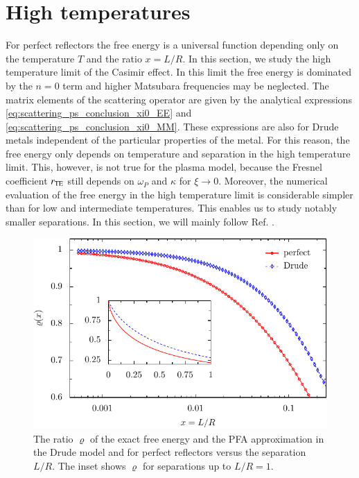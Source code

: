 \section{High temperatures}
\label{section_thermal_hi_temp}
\newcommand{\lnmu}{\log\,\mu}

For perfect reflectors the free energy is a universal function depending only
on the temperature $T$ and the ratio $x=L/R$. In this section, we study the
high temperature limit of the Casimir effect. In this limit the free energy is
dominated by the $n=0$ term and higher Matsubara frequencies may be
neglected. The matrix elements of the scattering operator are given by the
analytical expressions \eqref{eq:scattering_ps_conclusion_xi0_EE} and
\eqref{eq:scattering_ps_conclusion_xi0_MM}. These expressions are also for
Drude metals independent of the particular properties of the metal. For this
reason, the free energy only depends on temperature and separation in the high temperature
limit. This, however, is not true for the plasma model, because the Fresnel
coefficient $r_{\mathrm{TE}}$ still depends on $\omega_P$ and $\kappa$ for $\xi\to0$.
Moreover, the numerical evaluation of the free energy in the high temperature
limit is considerable simpler than for low and intermediate temperatures. This
enables us to study notably smaller separations. In this section, we will mainly
follow Ref. \cite{PhysRevA.85.052501}.

\begin{figure}
\begin{center}
\includegraphics[scale=1]{plots/hiT/rho_vs_lnx.pdf}
\end{center}

\caption{The ratio $\varrho$ of the exact free energy and the PFA approximation
in the Drude model and for perfect reflectors versus the separation $L/R$. The
inset shows $\varrho$ for separations up to $L/R=1$.}
\label{fig:temp_hi_rho}
\end{figure}


